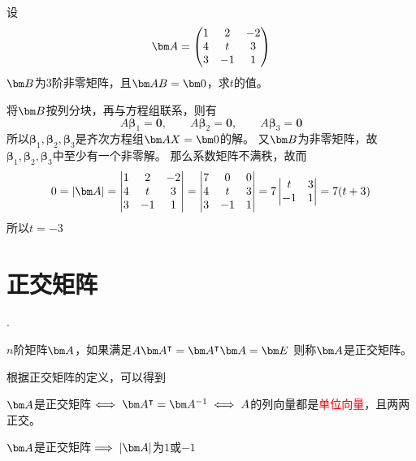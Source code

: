 \begin{example}
    设
    \[
        \mat{A} =
        \begin{pmatrix}
            1 & 2  & -2 \\
            4 & t  & 3  \\
            3 & -1 & 1
        \end{pmatrix}
    \]
    $\mat{B}$为$3$阶非零矩阵，且$\mat{AB}=\mat{0}$，求$t$的值。
\end{example}
\begin{solution}
    将$\mat{B}$按列分块，再与方程组联系，则有
    \[ A\bm{\beta}_1 = \bm{0},\qquad A\bm{\beta}_2 = \bm{0},\qquad A\bm{\beta}_3 = \bm{0} \]
    所以$\bm{\beta}_1,\bm{\beta}_2,\bm{\beta}_3$是齐次方程组$\mat{AX}=\mat{0}$的解。
    又$\mat{B}$为非零矩阵，故$\bm{\beta}_1,\bm{\beta}_2,\bm{\beta}_3$中至少有一个非零解。
    那么系数矩阵不满秩，故而
    \[
        0 = |\mat{A}| =
        \begin{vmatrix}
            1 & 2  & -2 \\
            4 & t  & 3  \\
            3 & -1 & 1
        \end{vmatrix}
        =
        \begin{vmatrix}
            7 & 0  & 0 \\
            4 & t  & 3 \\
            3 & -1 & 1
        \end{vmatrix}
        =
        7\begin{vmatrix}
            t  & 3 \\
            -1 & 1
        \end{vmatrix}
        =
        7(t+3)
    \]
    所以$t=-3$
\end{solution}

\section{正交矩阵}
\label{sec:正交矩阵}
.
\begin{definition}
    $n$阶矩阵$\mat{A}$，如果满足$A\mat{A}^\intercal = \mat{A}^\intercal \mat{A} = \mat{E}$
    则称$\mat{A}$是正交矩阵。
\end{definition}
根据正交矩阵的定义，可以得到
\begin{theorem}
    $\mat{A}$是正交矩阵$\iff \mat{A}^\intercal = \mat{A}^{-1} \iff A$的列向量都是\textcolor{red}{单位向量}，且两两正交。
\end{theorem}
\begin{theorem}
    $\mat{A}$是正交矩阵$\implies |\mat{A}|$为$1$或$-1$
\end{theorem}